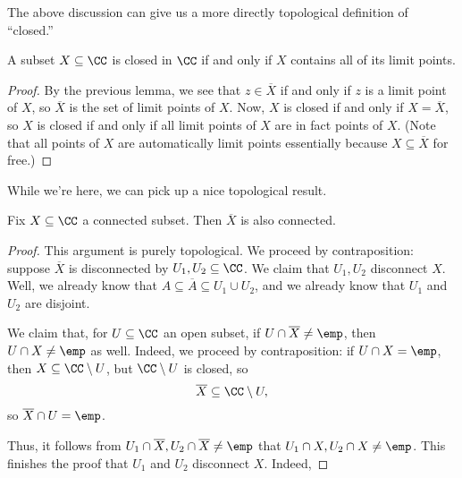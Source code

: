 The above discussion can give us a more directly topological definition of ``closed.''
\begin{lemma}
	A subset $X\subseteq\CC$ is closed in $\CC$ if and only if $X$ contains all of its limit points.
\end{lemma}
\begin{proof}
	By the previous lemma, we see that $z\in\overline X$ if and only if $z$ is a limit point of $X$, so $\overline X$ is the set of limit points of $X$. Now, $X$ is closed if and only if $X=\overline X$, so $X$ is closed if and only if all limit points of $X$ are in fact points of $X$. (Note that all points of $X$ are automatically limit points essentially because $X\subseteq\overline X$ for free.)
\end{proof}

While we're here, we can pick up a nice topological result.
\begin{lemma}
	Fix $X\subseteq\CC$ a connected subset. Then $\overline X$ is also connected.
\end{lemma}
\begin{proof}
	This argument is purely topological. We proceed by contraposition: suppose $\overline X$ is disconnected by $U_1,U_2\subseteq\CC$. We claim that $U_1,U_2$ disconnect $X$. Well, we already know that $A\subseteq\overline A\subseteq U_1\cup U_2$, and we already know that $U_1$ and $U_2$ are disjoint.

	We claim that, for $U\subseteq\CC$ an open subset, if $U\cap\overline X\ne\emp$, then $U\cap X\ne\emp$ as well. Indeed, we proceed by contraposition: if $U\cap X=\emp$, then $X\subseteq\CC\setminus U$, but $\CC\setminus U$ is closed, so
	\[\overline X\subseteq\CC\setminus U,\]
	so $\overline X\cap U=\emp$.

	Thus, it follows from $U_1\cap\overline X,U_2\cap\overline X\ne\emp$ that $U_1\cap X,U_2\cap X\ne\emp$. This finishes the proof that $U_1$ and $U_2$ disconnect $X$. Indeed, 
\end{proof}

